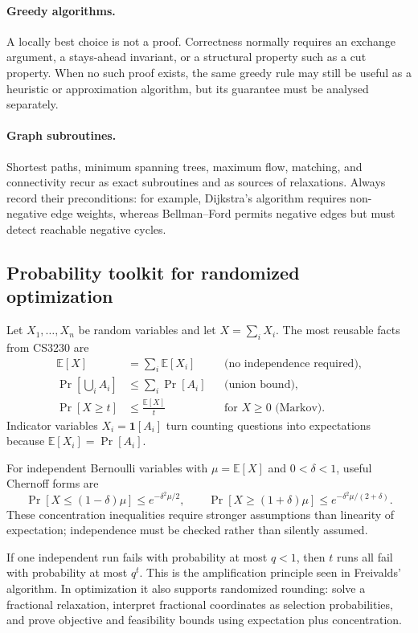 \documentclass[10pt]{article}
\theoremstyle{definition}
\begin{document}
\paragraph{Greedy algorithms.}
A locally best choice is not a proof.  Correctness normally requires an
exchange argument, a stays-ahead invariant, or a structural property such as
a cut property.  When no such proof exists, the same greedy rule may still be
useful as a heuristic or approximation algorithm, but its guarantee must be
analysed separately.

\paragraph{Graph subroutines.}
Shortest paths, minimum spanning trees, maximum flow, matching, and
connectivity recur as exact subroutines and as sources of relaxations.  Always
record their preconditions: for example, Dijkstra's algorithm requires
non-negative edge weights, whereas Bellman--Ford permits negative edges but
must detect reachable negative cycles.

\subsection{Probability toolkit for randomized optimization}

Let $X_1,\ldots,X_n$ be random variables and let
$X=\sum_i X_i$.  The most reusable facts from CS3230 are
\begin{align*}
\mathbb{E}[X]&=\sum_i\mathbb{E}[X_i]
&&\text{(no independence required)},\\
\Pr\!\left[\bigcup_i A_i\right]&\le\sum_i\Pr[A_i]
&&\text{(union bound)},\\
\Pr[X\ge t]&\le\frac{\mathbb{E}[X]}{t}
&&\text{for $X\ge0$ (Markov)}.
\end{align*}
Indicator variables $X_i=\mathbf{1}[A_i]$ turn counting questions into
expectations because $\mathbb{E}[X_i]=\Pr[A_i]$.

For independent Bernoulli variables with $\mu=\mathbb{E}[X]$ and
$0<\delta<1$, useful Chernoff forms are
\[
  \Pr[X\le(1-\delta)\mu]\le e^{-\delta^2\mu/2},\qquad
  \Pr[X\ge(1+\delta)\mu]\le e^{-\delta^2\mu/(2+\delta)}.
\]
These concentration inequalities require stronger assumptions than linearity
of expectation; independence must be checked rather than silently assumed.

If one independent run fails with probability at most $q<1$, then $t$ runs
all fail with probability at most $q^t$.  This is the amplification principle
seen in Freivalds' algorithm.  In optimization it also supports randomized
rounding: solve a fractional relaxation, interpret fractional coordinates as
selection probabilities, and prove objective and feasibility bounds using
expectation plus concentration.
\end{document}
